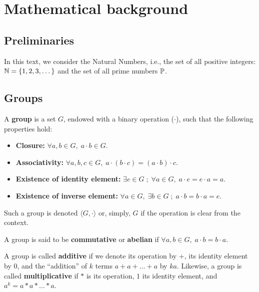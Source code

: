 \documentclass[a4paper,12pt]{article}
\begin{document}
\section{Mathematical background}
\label{mathematical-background}
\subsection{Preliminaries}
\label{sec:org23eaca5}
In this text, we  consider the Natural Numbers, i.e.,  the set of all positive integers: \(\N = \{1,2,3,\dots\}\) and the  set of all prime numbers \(\P\).

\subsection{Groups}
\label{sec:org087b7cb}

\begin{definition}
  A \textbf{group} is a set $G$, endowed with a binary operation ($\cdot$), such
  that the following properties hold:
  \begin{itemize}
  \item \textbf{Closure: } $\forall a,b \in G, \; a\cdot b \in G$.
  \item \textbf{Associativity: } $\forall a,b,c \in G, \; a\cdot(b\cdot c) = (a\cdot b)\cdot c$.
  \item \textbf{Existence of identity element: } $\exists e \in G \; ; \; \forall a \in G, \; a\cdot e = e\cdot a = a$.
  \item \textbf{Existence of inverse element: } $\forall a \in G, \; \exists b \in G \; ; \; a\cdot b = b \cdot a = e$.
  \end{itemize}
Such a group is denoted $\langle G,\cdot\rangle$ or, simply, $G$ if the operation is clear from the context.
\end{definition}

\begin{definition}
  A group is said to be \textbf{commutative} or \textbf{abelian}
  if $\forall a, b \in G, \; a\cdot b = b\cdot a$.
\end{definition}

\begin{text}
  \noindent
  A group is called \textbf{additive} if we denote its operation by $+$, its identity element by $0$, and the ``addition'' of $k$ terms $a+a+\ldots + a$ by $ka$. Likewise, a group is called  \textbf{multiplicative} if $*$ is its operation, $1$ its identity element, and $a^k=a * a * \ldots * a$. 

\end{text}
\end{document}
